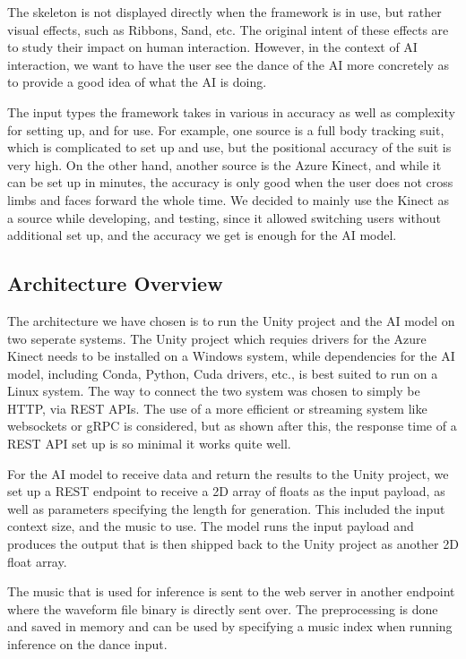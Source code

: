 \documentclass[final,5p,times,authoryear]{article}
\begin{document}
The skeleton is not displayed directly when the framework is in use, but rather visual effects, such as Ribbons, Sand, etc. The original intent of these effects are to study their impact on human interaction. However, in the context of AI interaction, we want to have the user see the dance of the AI more concretely as to provide a good idea of what the AI is doing.

The input types the framework takes in various in accuracy as well as complexity for setting up, and for use. For example, one source is a full body tracking suit, which is complicated to set up and use, but the positional accuracy of the suit is very high. On the other hand, another source is the Azure Kinect, and while it can be set up in minutes, the accuracy is only good when the user does not cross limbs and faces forward the whole time. We decided to mainly use the Kinect as a source while developing, and testing, since it allowed switching users without additional set up, and the accuracy we get is enough for the AI model.

\subsection{Architecture Overview}
The architecture we have chosen is to run the Unity project and the AI model on two seperate systems. The Unity project which requies drivers for the Azure Kinect needs to be installed on a Windows system, while dependencies for the AI model, including Conda, Python, Cuda drivers, etc., is best suited to run on a Linux system. The way to connect the two system was chosen to simply be HTTP, via REST APIs. The use of a more efficient or streaming system like websockets or gRPC is considered, but as shown after this, the response time of a REST API set up is so minimal it works quite well.

For the AI model to receive data and return the results to the Unity project, we set up a REST endpoint to receive a 2D array of floats as the input payload, as well as parameters specifying the length for generation. This included the input context size, and the music to use. The model runs the input payload and produces the output that is then shipped back to the Unity project as another 2D float array.

The music that is used for inference is sent to the web server in another endpoint where the waveform file binary is directly sent over. The preprocessing is done and saved in memory and can be used by specifying a music index when running inference on the dance input.
\end{document}
